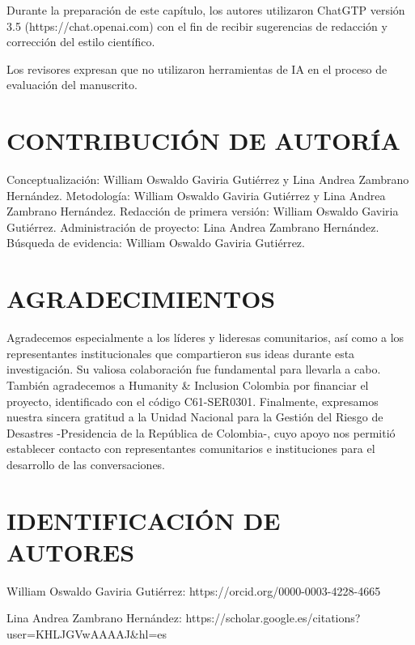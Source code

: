 \documentclass[
  spanish,
  letterpaper,
]{book}
\begin{document}
Durante la preparación de este capítulo, los autores utilizaron ChatGTP
versión 3.5 (https://chat.openai.com) con el fin de recibir sugerencias
de redacción y corrección del estilo científico.

Los revisores expresan que no utilizaron herramientas de IA en el
proceso de evaluación del manuscrito.


\chapter{CONTRIBUCIÓN DE AUTORÍA}\label{contribuciuxf3n-de-autoruxeda}

Conceptualización: William Oswaldo Gaviria Gutiérrez y Lina Andrea
Zambrano Hernández. Metodología: William Oswaldo Gaviria Gutiérrez y
Lina Andrea Zambrano Hernández. Redacción de primera versión: William
Oswaldo Gaviria Gutiérrez. Administración de proyecto: Lina Andrea
Zambrano Hernández. Búsqueda de evidencia: William Oswaldo Gaviria
Gutiérrez.


\chapter{AGRADECIMIENTOS}\label{agradecimientos-1}

Agradecemos especialmente a los líderes y lideresas comunitarios, así
como a los representantes institucionales que compartieron sus ideas
durante esta investigación. Su valiosa colaboración fue fundamental para
llevarla a cabo. También agradecemos a Humanity \& Inclusion Colombia
por financiar el proyecto, identificado con el código C61-SER0301.
Finalmente, expresamos nuestra sincera gratitud a la Unidad Nacional
para la Gestión del Riesgo de Desastres -Presidencia de la República de
Colombia-, cuyo apoyo nos permitió establecer contacto con
representantes comunitarios e instituciones para el desarrollo de las
conversaciones.


\chapter{IDENTIFICACIÓN DE AUTORES}\label{identificaciuxf3n-de-autores}

William Oswaldo Gaviria Gutiérrez: https://orcid.org/0000-0003-4228-4665

Lina Andrea Zambrano Hernández:
https://scholar.google.es/citations?user=KHLJGVwAAAAJ\&hl=es
\end{document}
